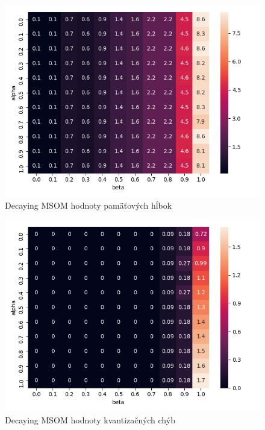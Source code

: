     
    \begin{figure}[H]
        \centering
        \includegraphics[width=\textwidth]{assets/dm_memory_span}
        \caption{Decaying MSOM hodnoty pamäťových hĺbok}
        \label{decay_memory_span}
    \end{figure}
    
    \begin{figure}[H]
        \centering
        \includegraphics[width=\textwidth]{assets/dm_errors}
        \caption{Decaying MSOM hodnoty kvantizačných chýb}
        \label{decay_errors}
    \end{figure}

